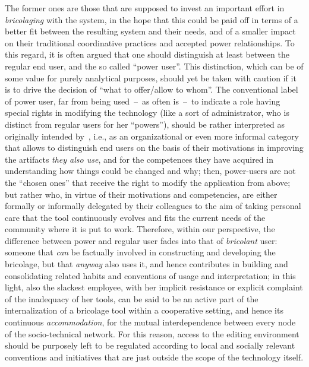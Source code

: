 \documentclass{article}
\begin{document}
The former ones are those that are supposed to invest an important effort in \emph{bricolaging} with the system, in the hope that this could be paid off in terms of a better fit between the resulting system and their needs, and of a smaller impact on their traditional coordinative practices and accepted power relationships. To this regard, it is often argued that one should distinguish at least between the regular end user, and the so called ``power user''. This distinction, which can be of some value for purely analytical purposes, should yet be taken with caution if it is to drive the decision of ``what to offer/allow to whom''. The conventional label of power user, far from being used~--~as often is~--~to indicate a role having special rights in modifying the technology (like a sort of administrator, who is distinct from regular users for her ``powers''), should be rather interpreted as originally intended by~\citet{bandini_eud_2006}, i.e., as an organizational or even more informal category that allows to distinguish end users on the basis of their motivations in improving the artifacts \emph{they also use}, and for the competences they have acquired in understanding how things could be changed and why; then, power-users are not the ``chosen ones'' that receive the right to modify the application from above; but rather who, in virtue of their motivations and competencies, are either formally or informally delegated by their colleagues to the aim of taking personal care that the tool continuously evolves and fits the current needs of the community where it is put to work. Therefore, within our perspective, the difference between power and regular user fades into that of \emph{bricolant} user: someone that \emph{can} be factually involved in constructing and developing the bricolage, but that \emph{anyway} also uses it, and hence contributes in building and consolidating related habits and conventions of usage and interpretation; in this light, also the slackest employee, with her implicit resistance or explicit complaint of the inadequacy of her tools, can be said to be an active part of the internalization of a bricolage tool within a cooperative setting, and hence its continuous \emph{accommodation}, for the mutual interdependence between every node of the socio-technical network. For this reason, access to the editing environment should be purposely left to be regulated according to local and socially relevant conventions and initiatives that are just outside the scope of the technology itself.
\end{document}
